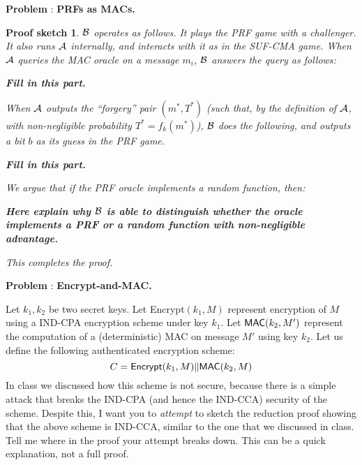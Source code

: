 \documentclass[11pt]{article}
\newtheorem{proofsketch}{Proof sketch}
\newcounter{problem}
\renewcommand{\theproblem}{\arabic{problem}}
\newenvironment{problem} {\stepcounter{problem} \textbf{Problem
    \theproblem}:} {\vspace{.1in}}
\begin{document}
\begin{problem} {\bf PRFs as MACs.}
\begin{proofsketch}
{${\cal B}$ operates as follows. It plays the {\sf PRF} game with a challenger. It also runs ${\cal A}$ internally, and interacts with it as in the {\sf SUF-CMA} game. When ${\cal A}$ queries the MAC oracle on a message $m_i$, ${\cal B}$ answers the query as follows:

\medskip \noindent
{\bf Fill in this part.}

\medskip \noindent
When ${\cal A}$ outputs the ``forgery'' pair $(m^*, T^*)$ (such that, by the definition of ${\cal A}$, with non-negligible probability $T^* = f_k(m^*)$), ${\cal B}$ does the following, and outputs a bit $b$ as its guess in the PRF game.

\medskip \noindent
{\bf Fill in this part.}

\medskip \noindent
We argue that if the PRF oracle implements a random function, then:

\medskip \noindent
{\bf Here explain why ${\cal B}$ is able to distinguish whether the oracle implements a PRF or a random function with non-negligible advantage.}


\medskip \noindent
This completes the proof.}
\end{proofsketch}

\end{problem}

\begin{problem} {\bf Encrypt-and-MAC.} 

\medskip \noindent Let $k_1, k_2$ be two secret keys. Let {\sf Encrypt}$(k_1, M)$ represent encryption of $M$ using a {\sf IND-CPA} encryption scheme under key $k_1$. Let ${\sf MAC}(k_2, M')$ represent the computation of a (deterministic) MAC on message $M'$ using key $k_2$. Let us define the following authenticated encryption scheme:
$$C = \mathsf{Encrypt}(k_1, M) \| {\sf MAC}(k_2, M) $$
In class we discussed how this scheme is not secure, because there is a simple attack that breaks the {\sf IND-CPA} (and hence the {\sf IND-CCA}) security of the scheme. Despite this, I want you to {\em attempt} to sketch the reduction proof showing that the above scheme is {\sf IND-CCA}, similar to the one that we discussed in class. Tell me where in the proof your attempt breaks down. This can be a quick explanation, not a full proof.
\end{problem}
\end{document}
